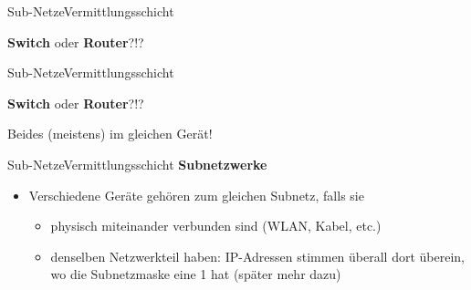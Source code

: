 \begin{frame}[fragile]{\faMapMarker{} Sub-Netze}{Vermittlungsschicht}
    \begin{center}
        \textbf{Switch} oder \textbf{Router}?!?
    \end{center}
    \begin{center}
        \resizebox{!}{.5\textheight}{}
    \end{center}
\end{frame}

\begin{frame}[fragile]{\faMapMarker{} Sub-Netze}{Vermittlungsschicht}
    \begin{center}
        \textbf{Switch} oder \textbf{Router}?!?
    \end{center}
    \begin{center}
        \resizebox{!}{.62\textheight}{}
    \end{center}
    \pause
    \begin{center}
        Beides (meistens) im gleichen Gerät!
    \end{center}
\end{frame}

\begin{frame}[fragile]{\faMapMarker{} Sub-Netze}{Vermittlungsschicht}
    \textbf{Subnetzwerke}
    \begin{itemize}[<+->]
        \item Verschiedene Geräte gehören zum gleichen Subnetz, falls sie
              \begin{itemize}
                  \item physisch miteinander verbunden sind (\acrshort{WLAN}, Kabel, etc.)
                  \item denselben Netzwerkteil haben: \gls{IP}-Adressen stimmen überall dort überein, wo die Subnetzmaske eine 1 hat (später mehr dazu)
              \end{itemize}
    \end{itemize}
\end{frame}


